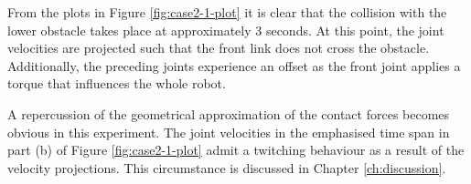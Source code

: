 From the plots in Figure \ref{fig:case2-1-plot} it is clear that the collision with the lower obstacle takes place at approximately 3 seconds. At this point, the joint velocities are projected such that the front link does not cross the obstacle. Additionally, the preceding joints experience an offset as the front joint applies a torque that influences the whole robot.

A repercussion of the geometrical approximation of the contact forces becomes obvious in this experiment. The joint velocities in the emphasised time span in part (b) of Figure \ref{fig:case2-1-plot} admit a twitching behaviour as a result of the velocity projections. This circumstance is discussed in Chapter \ref{ch:discussion}.

\begin{figure}[H]
    \centering
    
    \hfil
    

\end{figure}
